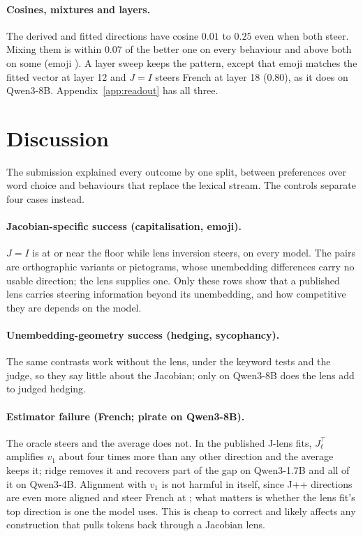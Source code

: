 \documentclass{article}
\begin{document}
\paragraph{Cosines, mixtures and layers.} The derived and fitted directions have cosine $0.01$ to $0.25$ even when both steer. Mixing them is within $0.07$ of the better one on every behaviour and above both on some (emoji \MIXEMOJI). A layer sweep keeps the pattern, except that emoji matches the fitted vector at layer 12 and $J{=}I$ steers French at layer 18 ($0.80$), as it does on Qwen3-8B. Appendix~\ref{app:readout} has all three.

\section{Discussion}
\label{sec:discussion}

The submission explained every outcome by one split, between preferences over word choice and behaviours that replace the lexical stream. The controls separate four cases instead.


\paragraph{Jacobian-specific success (capitalisation, emoji).} $J{=}I$ is at or near the floor while lens inversion steers, on every model. The pairs are orthographic variants or pictograms, whose unembedding differences carry no usable direction; the lens supplies one. Only these rows show that a published lens carries steering information beyond its unembedding, and how competitive they are depends on the model.

\paragraph{Unembedding-geometry success (hedging, sycophancy).} The same contrasts work without the lens, under the keyword tests and the judge, so they say little about the Jacobian; only on Qwen3-8B does the lens add to judged hedging.

\paragraph{Estimator failure (French; pirate on Qwen3-8B).} The oracle steers and the average does not. In the published J-lens fits, $J_\ell^\top$ amplifies $v_1$ about four times more than any other direction and the average keeps it; ridge removes it and recovers part of the gap on Qwen3-1.7B and all of it on Qwen3-4B. Alignment with $v_1$ is not harmful in itself, since J++ directions are even more aligned and steer French at \FOURFRENCHOURSJPP; what matters is whether the lens fit's top direction is one the model uses. This is cheap to correct and likely affects any construction that pulls tokens back through a Jacobian lens.
\end{document}
